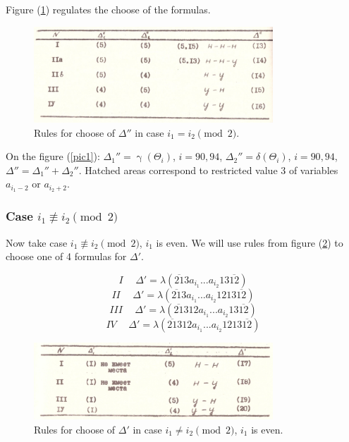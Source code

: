 \documentclass[a4paper, 12pt]{article}
\let\oldref\ref
\renewcommand{\ref}[1]{(\oldref{#1})}
\theoremstyle{definition}
\theoremstyle{definition}
\theoremstyle{proposition}
\theoremstyle{lemma}
\newcommand{\g}{\upgamma}
\renewcommand{\d}{\delta}
\newcommand{\D}{\Delta}
\newcommand{\T}{\Theta}
\begin{document}
Figure \ref{table1} regulates the choose of the formulas.

\begin{figure}[ht]
	\centering
	\includegraphics[width=0.8\textwidth]{table1}
	\caption{Rules for choose of $\D''$ in case $i_1 = i_2 \pmod 2$.}
	\label{table1}
\end{figure}

On the figure \ref{pic1}:
$\D_1'' = \g(\T_i)$, $i = 90, 94$,
$\D_2'' = \d  (\T_i)$, $i = 90, 94$,
$\D'' = \D_1'' + \D_2''$.
Hatched areas correspond to restricted value 3 of variables
$a_{i_1 - 2}$ or $a_{i_2 + 2}$.

\subsubsection{Case $i_1 \not\equiv i_2 \pmod 2$}

Now take case $i_1 \not\equiv i_2 \pmod 2$, $i_1$ is even. We will use rules from figure \ref{table2} to choose one of 4 formulas for $\D'$.

\begin{equation}\tag{11.17}
	I \hspace{15pt}
	\D' = \lambda(\overline{21}3a_{i_1}... a_{i_2}13\overline{12})
\end{equation}
\begin{equation}\tag{11.18}
	II \hspace{15pt}
	\D' = \lambda(\overline{21}3a_{i_1}... a_{i_2}1213\overline{12})
\end{equation}
\begin{equation}\tag{11.19}
	III \hspace{15pt}
	\D' = \lambda(\overline{21}312a_{i_1}... a_{i_2}13\overline{12})
\end{equation}
\begin{equation}\tag{11.20}
	IV \hspace{15pt}
	\D' = \lambda(\overline{21}312a_{i_1}... a_{i_2}1213\overline{12})
\end{equation}

\begin{figure}[ht]
	\centering
	\includegraphics[width=0.8\textwidth]{table2}
	\caption{Rules for choose of $\D'$ in case $i_1 \ne i_2 \pmod 2$, $i_1$ is even.}
	\label{table2}
\end{figure}
\end{document}
